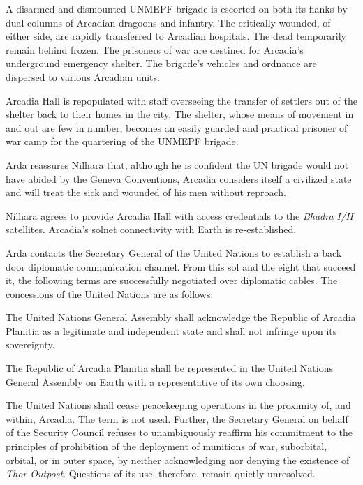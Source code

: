 

A disarmed and dismounted UNMEPF brigade is escorted on both its flanks by dual columns of Arcadian dragoons and infantry. The critically wounded, of either side, are rapidly transferred to Arcadian hospitals. The dead temporarily remain behind frozen. The prisoners of war are destined for Arcadia's underground emergency shelter. The brigade's vehicles and ordnance are dispersed to various Arcadian units.

Arcadia Hall is repopulated with staff overseeing the transfer of settlers out of the shelter back to their homes in the city. The shelter, whose means of movement in and out are few in number, becomes an easily guarded and practical prisoner of war camp for the quartering of the UNMEPF brigade.

Arda reassures Nilhara that, although he is confident the UN brigade would not have abided by the Geneva Conventions, Arcadia considers itself a civilized state and will treat the sick and wounded of his men without reproach.
\StopTimelineDate

Nilhara agrees to provide Arcadia Hall with access credentials to the {\it Bhadra I/II} satellites. Arcadia's solnet connectivity with Earth is re-established.

Arda contacts the Secretary General of the United Nations to establish a back door diplomatic communication channel. From this sol and the eight that succeed it, the following terms are successfully negotiated over diplomatic cables. The concessions of the United Nations are as follows:
\startitemize[n]
\item The United Nations General Assembly shall acknowledge the Republic of Arcadia Planitia as a legitimate and independent state and shall not infringe upon its sovereignty.
\item The Republic of Arcadia Planitia shall be represented in the United Nations General Assembly on Earth with a representative of its own choosing.
\item The United Nations shall cease peacekeeping operations in the proximity of, and within, Arcadia. The term  is not used. Further, the Secretary General on behalf of the Security Council refuses to unambiguously reaffirm his commitment to the principles of prohibition of the deployment of munitions of war, suborbital, orbital, or in outer space, by neither acknowledging nor denying the existence of {\it Thor Outpost}. Questions of its use, therefore, remain quietly unresolved.
\stopitemize

